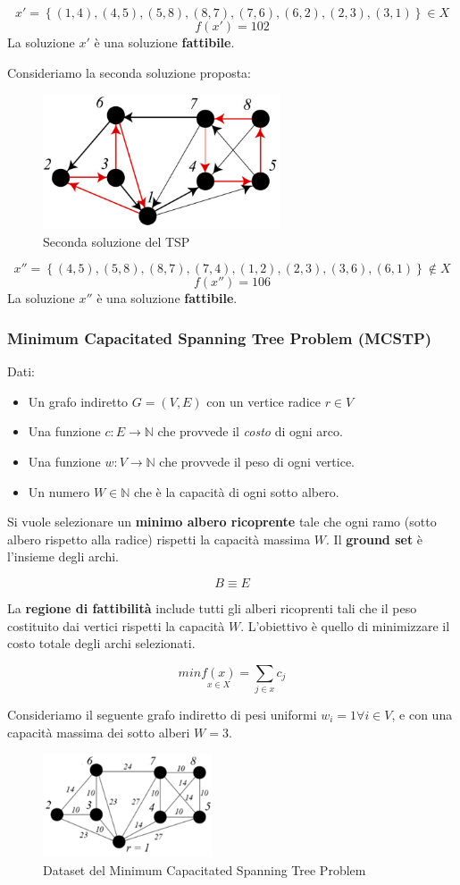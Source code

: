 \documentclass{article}
\begin{document}
$$x'=\left\{(1,4),(4,5),(5,8),(8,7),(7,6),(6,2),(2,3),(3,1)\right\}\in X$$
$$f(x')=102$$
La soluzione $x'$ è una soluzione \textbf{fattibile}.

Consideriamo la seconda soluzione proposta:
\begin{figure}[H]
    \centering
    \includegraphics[width=7cm]{images/TSP_sol2.png}
    \caption{Seconda soluzione del TSP}
    \label{fig:tsp_2_sol}
\end{figure}
$$x''=\left\{(4,5),(5,8),(8,7),(7,4),(1,2),(2,3),(3,6),(6,1)\right\}\notin X$$
$$f(x'')=106$$
La soluzione $x''$ è una soluzione \textbf{fattibile}.

\subsubsection{Minimum Capacitated Spanning Tree Problem (MCSTP)}
Dati:
\begin{itemize}
    \item Un grafo indiretto $G=(V,E)$ con un vertice radice $r\in V$
    \item Una funzione $c:E\rightarrow \mathbb{N}$ che provvede il \textit{costo} di ogni arco.
    \item Una funzione $w:V\rightarrow \mathbb{N}$ che provvede il peso di ogni vertice.
    \item Un numero $W\in \mathbb{N}$ che è la capacità di ogni sotto albero.
\end{itemize}

Si vuole selezionare un \textbf{minimo albero ricoprente} tale che ogni ramo (sotto albero rispetto alla radice)
rispetti la capacità massima $W$. Il \textbf{ground set} è l'insieme degli archi.

$$B\equiv E$$

La \textbf{regione di fattibilità} include tutti gli alberi ricoprenti tali che il peso costituito dai vertici
rispetti la capacità $W$.
L'obiettivo è quello di minimizzare il costo totale degli archi selezionati.

$$min\underset{x\in X}{f(x)}=\sum_{j\in x}c_j$$

Consideriamo il seguente grafo indiretto di pesi uniformi $w_i=1 \forall i\in V$, e con una capacità massima
dei sotto alberi $W=3$.
\begin{figure}[H]
    \centering
    \includegraphics[width=5cm]{images/MCSTP_dataset.png}
    \caption{Dataset del Minimum Capacitated Spanning Tree Problem}
    \label{fig:dataset_MCSTP}
\end{figure}
\end{document}
